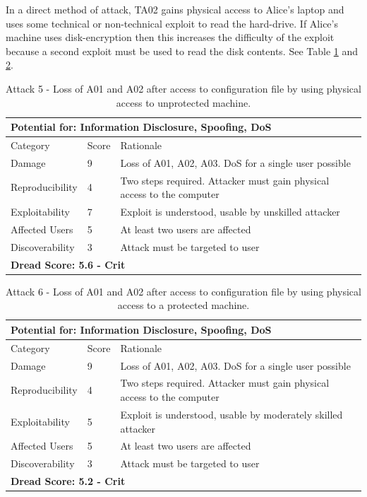 \documentclass [11pt, proquest] {uwthesis}[2020/02/24]
\begin{document}
In a direct method of attack, TA02 gains physical access to Alice's laptop and uses some technical or non-technical exploit to read the hard-drive. If Alice's machine uses disk-encryption then this increases the difficulty of the exploit because a second exploit must be used to read the disk contents.
See Table \ref{ref:attack5} and \ref{ref:attack6}.
\begin{table}[H]
\begin{tabular}{|m{3cm}|m{1cm}|p{27em} |}
\multicolumn{3}{l}{Potential for: Information Disclosure, Spoofing, DoS}                   \\
\hline
Category & Score & Rationale \\
\hline
Damage          & 9     & Loss of A01, A02, A03. DoS for a single user possible            \\
\hline
Reproducibility & 4     & Two steps required. Attacker must gain physical access to the computer     \\
\hline
Exploitability & 7      & Exploit is understood, usable by unskilled attacker \\
\hline
Affected Users  & 5     & At least two users are affected                      \\
\hline
Discoverability & 3     & Attack must be targeted to user \\
\hline
\multicolumn{3}{l}{\textbf{Dread Score: 5.6 - Crit}} 
\end{tabular}
\caption{Attack 5 - Loss of A01 and A02 after access to configuration file by using physical access to unprotected machine.}
\label{ref:attack5}
\end{table}

\begin{table}[H]
\begin{tabular}{|m{3cm}|m{1cm}|p{27em} |}
\multicolumn{3}{l}{Potential for: Information Disclosure, Spoofing, DoS}                   \\
\hline
Category & Score & Rationale \\
\hline
Damage          & 9     & Loss of A01, A02, A03. DoS for a single user possible            \\
\hline
Reproducibility & 4     & Two steps required. Attacker must gain physical access to the computer     \\
\hline
Exploitability & 5      & Exploit is understood, usable by moderately skilled attacker  \\
\hline
Affected Users  & 5     & At least two users are affected                      \\
\hline
Discoverability & 3     & Attack must be targeted to user \\
\hline
\multicolumn{3}{l}{\textbf{Dread Score: 5.2 - Crit}} 
\end{tabular}
\caption{Attack 6 - Loss of A01 and A02 after access to configuration file by using physical access to a protected machine.}
\label{ref:attack6}
\end{table}
\end{document}
